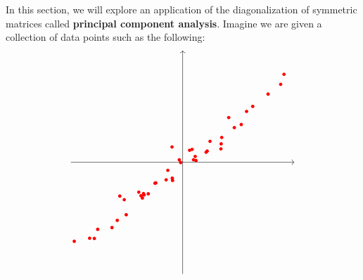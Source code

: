 \documentclass{ximera}
\begin{document}
In this section, we will explore an application of the diagonalization
of symmetric matrices called \textbf{principal component analysis}.
Imagine we are given a collection of data points such as the
following:
\begin{equation}\label{eqn:subspace-fitting}
  \begin{tikzpicture}[baseline=-0.5ex]
    \draw[thin,->] (-4,0) -- (4,0);
    \draw[thin,->] (0,-4) -- (0,4);
    \fill[color=red] (-2.25,-1.21) circle (0.06);
    \fill[color=red] (-1.44,-1.28) circle (0.06);
    \fill[color=red] (2.29,1.82) circle (0.06);
    \fill[color=red] (0.25,0.43) circle (0.06);
    \fill[color=red] (-1.57,-1.07) circle (0.06);
    \fill[color=red] (2.51,2.00) circle (0.06);
    \fill[color=red] (-2.53,-2.34) circle (0.06);
    \fill[color=red] (-3.04,-2.40) circle (0.06);
    \fill[color=red] (0.84,0.36) circle (0.06);
    \fill[color=red] (-3.16,-2.73) circle (0.06);
    \fill[color=red] (-2.02,-1.88) circle (0.06);
    \fill[color=red] (3.06,2.44) circle (0.06);
    \fill[color=red] (-1.40,-1.12) circle (0.06);
    \fill[color=red] (-2.09,-1.34) circle (0.06);
    \fill[color=red] (-1.23,-1.13) circle (0.06);
    \fill[color=red] (0.48,0.06) circle (0.06);
    \fill[color=red] (-1.49,-1.20) circle (0.06);
    \fill[color=red] (0.98,0.75) circle (0.06);
    \fill[color=red] (1.40,0.89) circle (0.06);
    \fill[color=red] (-0.12,0.09) circle (0.06);
    \fill[color=red] (0.88,0.40) circle (0.06);
    \fill[color=red] (-0.38,0.55) circle (0.06);
    \fill[color=red] (0.34,0.46) circle (0.06);
    \fill[color=red] (0.45,0.21) circle (0.06);
    \fill[color=red] (-0.59,-0.63) circle (0.06);
    \fill[color=red] (-0.53,-0.29) circle (0.06);
    \fill[color=red] (2.10,1.35) circle (0.06);
    \fill[color=red] (1.65,1.60) circle (0.06);
    \fill[color=red] (-3.88,-2.83) circle (0.06);
    \fill[color=red] (-0.07,-0.01) circle (0.06);
    \fill[color=red] (-0.37,-0.57) circle (0.06);
    \fill[color=red] (-0.99,-0.75) circle (0.06);
    \fill[color=red] (-2.34,-2.08) circle (0.06);
    \fill[color=red] (3.63,3.15) circle (0.06);
    \fill[color=red] (1.37,0.48) circle (0.06);
    \fill[color=red] (-0.96,-0.74) circle (0.06);
    \fill[color=red] (3.51,2.79) circle (0.06);
    \fill[color=red] (-3.33,-2.72) circle (0.06);
    \fill[color=red] (0.39,0.09) circle (0.06);
    \fill[color=red] (-1.38,-1.17) circle (0.06);
    \fill[color=red] (-0.36,-0.65) circle (0.06);
    \fill[color=red] (1.38,0.66) circle (0.06);
    \fill[color=red] (1.85,1.24) circle (0.06);

\end{tikzpicture}
\end{equation}
\end{document}
